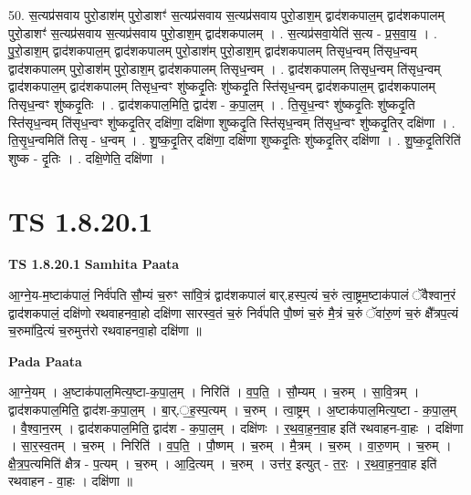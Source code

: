 \documentclass[17pt]{extarticle}
\begin{document}
50. स॒त्यप्र॑सवाय पुरो॒डाश॑म् पुरो॒डाशꣳ॑ स॒त्यप्र॑सवाय स॒त्यप्र॑सवाय पुरो॒डाश॒म् द्वाद॑शकपाल॒म् द्वाद॑शकपालम् पुरो॒डाशꣳ॑ स॒त्यप्र॑सवाय स॒त्यप्र॑सवाय पुरो॒डाश॒म् द्वाद॑शकपालम् । . स॒त्यप्र॑सवा॒येति॑ स॒त्य - प्र॒स॒वा॒य॒ । . पु॒रो॒डाश॒म् द्वाद॑शकपाल॒म् द्वाद॑शकपालम् पुरो॒डाश॑म् पुरो॒डाश॒म् द्वाद॑शकपालम् तिसृध॒न्वम् ति॑सृध॒न्वम् द्वाद॑शकपालम् पुरो॒डाश॑म् पुरो॒डाश॒म् द्वाद॑शकपालम् तिसृध॒न्वम् । . द्वाद॑शकपालम् तिसृध॒न्वम् ति॑सृध॒न्वम् द्वाद॑शकपाल॒म् द्वाद॑शकपालम् तिसृध॒न्वꣳ शु॑ष्कदृ॒तिः शु॑ष्कदृ॒ति स्ति॑सृध॒न्वम् द्वाद॑शकपाल॒म् द्वाद॑शकपालम् तिसृध॒न्वꣳ शु॑ष्कदृ॒तिः । . द्वाद॑शकपाल॒मिति॒ द्वाद॑श - क॒पा॒ल॒म् । . ति॒सृ॒ध॒न्वꣳ शु॑ष्कदृ॒तिः शु॑ष्कदृ॒ति स्ति॑सृध॒न्वम् ति॑सृध॒न्वꣳ शु॑ष्कदृ॒तिर् दक्षि॑णा॒ दक्षि॑णा शुष्कदृ॒ति स्ति॑सृध॒न्वम् ति॑सृध॒न्वꣳ शु॑ष्कदृ॒तिर् दक्षि॑णा । . ति॒सृ॒ध॒न्वमिति॑ तिसृ - ध॒न्वम् । . शु॒ष्क॒दृ॒तिर् दक्षि॑णा॒ दक्षि॑णा शुष्कदृ॒तिः शु॑ष्कदृ॒तिर् दक्षि॑णा । . शु॒ष्क॒दृ॒तिरिति॑ शुष्क - दृ॒तिः । . दक्षि॒णेति॒ दक्षि॑णा । \newline
\pagebreak
{}

\section{ TS 1.8.20.1 }

\textbf{TS 1.8.20.1 } \newline
\textbf{Samhita Paata} \newline

आ॒ग्ने॒य-म॒ष्टाक॑पालं॒ निर्व॑पति सौ॒म्यं च॒रुꣳ सा॑वि॒त्रं द्वाद॑शकपालं बार्.हस्प॒त्यं च॒रुं त्वा॒ष्ट्रम॒ष्टाक॑पालं ॅवैश्वान॒रं द्वाद॑शकपालं॒ दक्षि॑णो रथवाहनवा॒हो दक्षि॑णा सारस्व॒तं च॒रुं निर्व॑पति पौ॒ष्णं च॒रुं मै॒त्रं च॒रुं ॅवा॑रु॒णं च॒रुं क्षै᳚त्रप॒त्यं च॒रुमा॑दि॒त्यं च॒रुमुत्त॑रो रथवाहनवा॒हो दक्षि॑णा ॥ \newline

\textbf{Pada Paata} \newline

आ॒ग्ने॒यम् । अ॒ष्टाक॑पाल॒मित्य॒ष्टा-क॒पा॒ल॒म् । निरिति॑ । व॒प॒ति॒ । सौ॒म्यम् । च॒रुम् । सा॒वि॒त्रम् । द्वाद॑शकपाल॒मिति॒ द्वाद॑श-क॒पा॒ल॒म् । बा॒र्.॒ह॒स्प॒त्यम् । च॒रुम् । त्वा॒ष्ट्रम् । अ॒ष्टाक॑पाल॒मित्य॒ष्टा - क॒पा॒ल॒म् । वै॒श्वा॒न॒रम् । द्वाद॑शकपाल॒मिति॒ द्वाद॑श - क॒पा॒ल॒म् । दक्षि॑णः । र॒थ॒वा॒ह॒न॒वा॒ह इति॑ रथवाहन-वा॒हः । दक्षि॑णा । सा॒र॒स्व॒तम् । च॒रुम् । निरिति॑ । व॒प॒ति॒ । पौ॒ष्णम् । च॒रुम् । मै॒त्रम् । च॒रुम् । वा॒रु॒णम् । च॒रुम् । क्षै॒त्र॒प॒त्यमिति॑ क्षैत्र - प॒त्यम् । च॒रुम् । आ॒दि॒त्यम् । च॒रुम् । उत्त॑र॒ इत्युत् - त॒रः॒ । र॒थ॒वा॒ह॒न॒वा॒ह इति॑ रथवाहन - वा॒हः । दक्षि॑णा ॥  \newline
\end{document}
